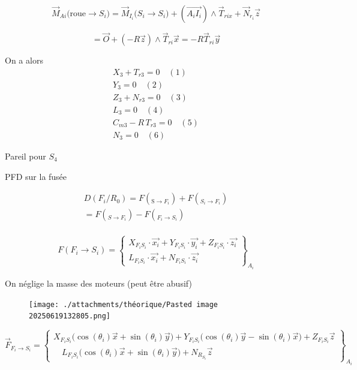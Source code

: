 \documentclass[a4paper,12pt]{report}  %
\begin{document}
$$
\vec{M}_{Ai}({\text{roue} \rightarrow S_i)} = \vec{M}_{I_i}({S_i \rightarrow S_i)} + \left( \overrightarrow{A_iI_i} \right) \wedge \vec{T}_{rix} + \vec{N}_{r_i} \vec{z}
$$

$$ = \vec{O} + ({-R}\vec{z})\wedge\vec{T}_{ri}\vec{x} = -R\vec{T}_{ri}\vec{y}
$$

On a alors
\begin{align}
	X_3 + T_{r3} = 0 \quad (1) \\
	Y_3 = 0 \quad (2) \\
	Z_3 + N_{r3} = 0 \quad (3) \\
	L_3 = 0 \quad  (4) \\
	C_{m3} - R\,T_{r3} = 0 \quad  (5) \\
	N_3 = 0 \quad  (6)
\end{align}


Pareil pour $S_4$

PFD sur la fusée


\begin{align}
	D(F_i/R_0) = {F}(_{\text{S}\rightarrow F_i}) + {F}(_{S_i \rightarrow F_i}) \\
	= {F}(_{S \rightarrow F_i}) - {F}(_{F_i \rightarrow S_i}) \\
\end{align}






\begin{equation}
F(F_i \to S_i) = 
\begin{Bmatrix}
	X_{F_i S_i} \cdot \vec{x_i} + Y_{F_i S_i} \cdot \vec{y_i} + Z_{F_i S_i} \cdot \vec{z_i} \\
	L_{F_i S_i} \cdot \vec{x_i} + N_{F_i S_i} \cdot \vec{z_i}
\end{Bmatrix}_{A_{i}}
\end{equation}



On néglige la masse des moteurs (peut être abusif)


\begin{figure}[H]
	\centering
	\texttt{[image: ./attachments/théorique/Pasted image 20250619132805.png]}
	\caption{}
\end{figure}



\begin{equation}
\vec{F}_{F_i \to S_i} =
\left\{
\begin{array}{c}
	X_{F_iS_i} \big(\cos(\theta_i) \vec{x} + \sin(\theta_i) \vec{y} \big) 
	
	+  Y_{F_iS_i} \big(\cos(\theta_i) \vec{y} - \sin(\theta_i) \vec{x} \big)
	
	+ Z_{F_iS_i} \vec{z} \\[1em]
	
	\quad L_{F_iS_i} \big(\cos(\theta_i) \vec{x} + \sin(\theta_i) \vec{y} \big)  + N_{R_{S_i}} \vec{z}
	
\end{array}
\right\}_{A_i}
\end{equation}
\end{document}
